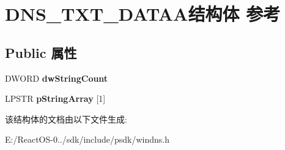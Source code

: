 \hypertarget{struct_d_n_s___t_x_t___d_a_t_a_a}{}\section{D\+N\+S\+\_\+\+T\+X\+T\+\_\+\+D\+A\+T\+A\+A结构体 参考}
\label{struct_d_n_s___t_x_t___d_a_t_a_a}
\subsection*{Public 属性}
\begin{DoxyCompactItemize}
\item 
\mbox{\label{struct_d_n_s___t_x_t___d_a_t_a_a_af131e3efbb52e6cf352a875302015e0d}} 
D\+W\+O\+RD {\bfseries dw\+String\+Count}
\item 
\mbox{\label{struct_d_n_s___t_x_t___d_a_t_a_a_a629e05d64f09a4c547f7ce15b8be855d}} 
L\+P\+S\+TR {\bfseries p\+String\+Array} \mbox{[}1\mbox{]}
\end{DoxyCompactItemize}


该结构体的文档由以下文件生成\+:\begin{DoxyCompactItemize}
\item 
E\+:/\+React\+O\+S-\/0../sdk/include/psdk/windns.\+h\end{DoxyCompactItemize}
